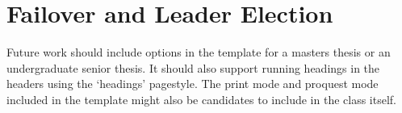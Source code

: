 \section{Failover and Leader Election}

Future work should include options in the template for a masters thesis or an undergraduate senior thesis. It should also support running headings in the headers using the `headings' pagestyle.  The print mode and proquest mode included in the template might also be candidates to include in the class itself. 

 